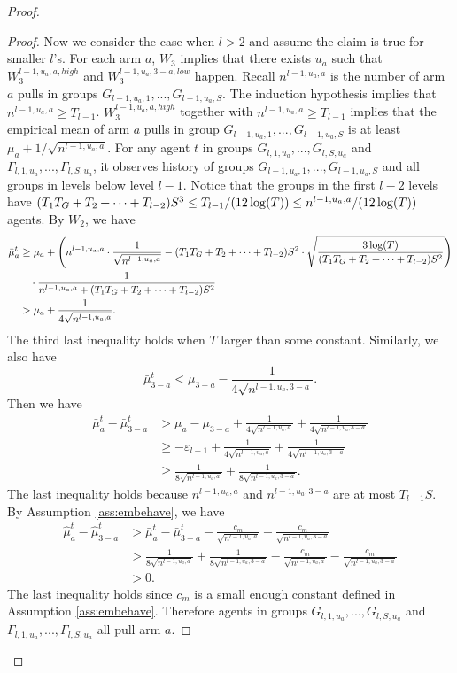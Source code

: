 \begin{proof}
\begin{proof}
Now we consider the case when $l > 2$ and assume the claim is true for smaller $l$'s. For each arm $a$, $W_3$ implies that there exists $u_a$ such that $W^{l-1,u_a,a,high}_3$ and $W^{l-1,u_a,3-a,low}_3$ happen. Recall $n^{l-1,u_a,a}$ is the number of arm $a$ pulls in groups $G_{l-1,u_a,1},...,G_{l-1,u_a,S}$. The induction hypothesis implies that $n^{l-1,u_a,a} \geq T_{l-1}$. $W^{l-1,u_a,a,high}_3$ together with $n^{l-1,u_a,a} \geq T_{l-1}$ implies that the empirical mean of arm $a$ pulls in group $G_{l-1,u_a,1},...,G_{l-1,u_a,S}$ is at least $\mu_a + 1/\sqrt{n^{l-1,u_a,a}}$. For any agent $t$ in groups $G_{l,1,u_a},...,G_{l,S,u_a}$ and $\Gamma_{l,1,u_a},...,\Gamma_{l,S,u_a}$, it observes history of groups $G_{l-1,u_a,1},...,G_{l-1,u_a,S}$ and all groups in levels below level $l-1$. Notice that the groups in the first $l-2$ levels have $(T_1 T_G + T_2 + \cdots +T_{l-2})S^3 \leq T_{l-1}/(12\log(T)) \leq n^{l-1,u_a,a}/(12\log(T))$ agents. By $W_2$, we have
\begin{align*}
\bar{\mu}_a ^t &\geq \mu_a + \left(n^{l-1,u_a,a}  \cdot \frac{1}{\sqrt{n^{l-1,u_a,a} }}- (T_1 T_G + T_2 + \cdots +T_{l-2})S^2\cdot \sqrt{\frac{3\log(T)}{ (T_1 T_G + T_2 + \cdots +T_{l-2})S^2}} \right) \\
&~~~\cdot \frac{1}{n^{l-1,u_a,a}+ (T_1 T_G + T_2 + \cdots +T_{l-2})S^2} \\
&> \mu_a + \frac{1}{4\sqrt{n^{l-1,u_a,a}  }}.
\end{align*}
The third last inequality holds when $T$ larger than some constant.
Similarly, we also have
\[
\bar{\mu}_{3-a}^t < \mu_{3-a}   -\frac{1}{4\sqrt{n^{l-1,u_a,3-a}  }}.
\]
Then we have
\begin{align*}
\bar{\mu}^t_a - \bar{\mu}^t_{3-a} &> \mu_a - \mu_{3-a}+ \frac{1}{4\sqrt{n^{l-1,u_a,a}  }} +\frac{1}{4\sqrt{n^{l-1,u_a,3-a}  }}\\
&\geq -\varepsilon_{l-1}+ \frac{1}{4\sqrt{n^{l-1,u_a,a}  }} +\frac{1}{4\sqrt{n^{l-1,u_a,3-a}  }}\\
&\geq \frac{1}{8\sqrt{n^{l-1,u_a,a}  }} +\frac{1}{8\sqrt{n^{l-1,u_a,3-a}  }}.
\end{align*}
The last inequality holds because $n^{l-1,u_a,a}$ and $n^{l-1,u_a,3-a}$ are at most $T_{l-1} S$. By Assumption \ref{ass:embehave}, we have
\begin{align*}
\hat{\mu}_a^t - \hat{\mu}_{3-a}^t &> \bar{\mu}^t_a - \bar{\mu}^t_{3-a} -  \frac{c_m}{\sqrt{n^{l-1,u_a,a} }} - \frac{c_m}{\sqrt{n^{l-1,u_a,3-a}}}\\
&> \frac{1}{8\sqrt{n^{l-1,u_a,a}  }} +\frac{1}{8\sqrt{n^{l-1,u_a,3-a}  }} -  \frac{c_m}{\sqrt{n^{l-1,u_a,a} }} - \frac{c_m}{\sqrt{n^{l-1,u_a,3-a}}}\\
&>0.
\end{align*}
The last inequality holds since $c_m$ is a small enough constant defined in Assumption \ref{ass:embehave}.
Therefore agents in groups $G_{l,1,u_a},...,G_{l,S,u_a}$ and $\Gamma_{l,1,u_a},...,\Gamma_{l,S,u_a}$ all pull arm $a$.
\end{proof}


\end{proof}
